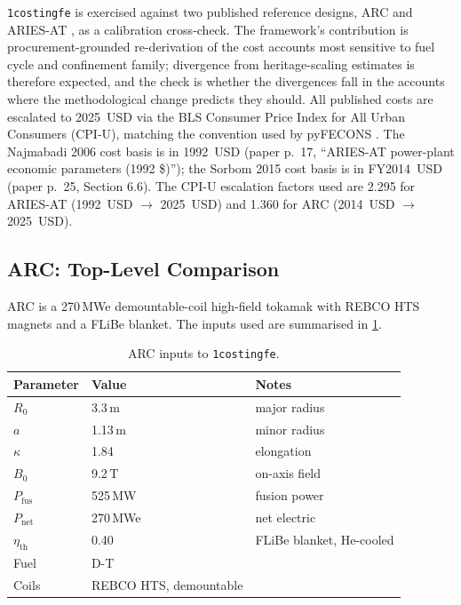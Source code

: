 \documentclass{article}
\begin{document}
\texttt{1costingfe} is exercised against two published
reference designs, ARC \citep{sorbom2015arc} and ARIES-AT
\citep{najmabadi2006ariesat}, as a calibration cross-check. The
framework's contribution is procurement-grounded re-derivation
of the cost accounts most sensitive to fuel cycle and confinement
family; divergence from heritage-scaling estimates is therefore
expected, and the check is whether the divergences fall in the
accounts where the methodological change predicts they should.
All published costs are escalated to 2025~USD via the BLS Consumer
Price Index for All Urban Consumers (CPI-U), matching the convention
used by pyFECONS \citep{woodruff2026}.
The Najmabadi 2006 cost basis is in 1992~USD (paper p.~17, ``ARIES-AT
power-plant economic parameters (1992 \$)''); the Sorbom 2015 cost
basis is in FY2014~USD (paper p.~25, Section 6.6). The CPI-U
escalation factors used are 2.295 for ARIES-AT (1992~USD $\to$
2025~USD) and 1.360 for ARC (2014~USD $\to$ 2025~USD).

\subsection{ARC: Top-Level Comparison}
\label{sec:benchmark-arc}

ARC \citep{sorbom2015arc} is a 270\,MWe demountable-coil high-field
tokamak with REBCO HTS magnets and a FLiBe blanket. The inputs used
are summarised in \cref{tab:arc-inputs}.

\begin{table}[h]
\centering
\caption{ARC inputs to \texttt{1costingfe}.}
\label{tab:arc-inputs}
\begin{tabular}{lll}
\toprule
Parameter & Value & Notes \\
\midrule
$R_0$ & 3.3\,m & major radius \\
$a$ & 1.13\,m & minor radius \\
$\kappa$ & 1.84 & elongation \\
$B_0$ & 9.2\,T & on-axis field \\
$P_\text{fus}$ & 525\,MW & fusion power \\
$P_\text{net}$ & 270\,MWe & net electric \\
$\eta_\text{th}$ & 0.40 & FLiBe blanket, He-cooled \\
Fuel & D-T & \\
Coils & REBCO HTS, demountable & \\
\bottomrule
\end{tabular}
\end{table}
\end{document}
